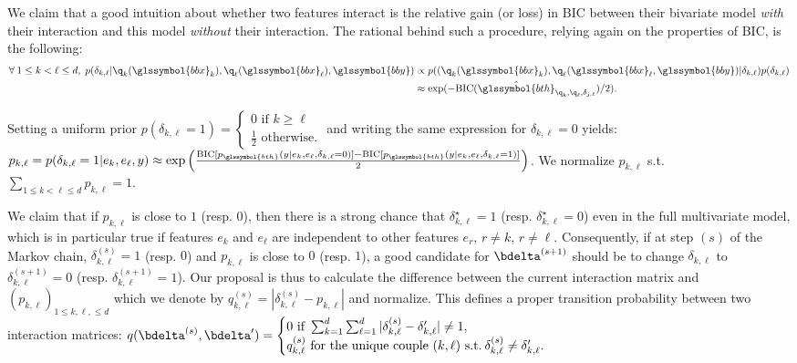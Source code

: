 We claim that a good intuition about whether two features interact is the relative gain (or loss) in BIC between their bivariate model \textit{with} their interaction and this model \textit{without} their interaction. The rational behind such a procedure, relying again on the properties of BIC, is the following: 
\begin{align*}
\forall \: 1 \leq k < \ell \leq d, \; p(\delta_{k,\ell} | \q_k(\glssymbol{bbx}_k), \q_\ell(\glssymbol{bbx}_\ell), \glssymbol{bby}) & \propto p((\q_k(\glssymbol{bbx}_k), \q_\ell(\glssymbol{bbx}_\ell, \glssymbol{bby}) | \delta_{k,\ell}) p(\delta_{k,\ell}) \\
& \approx \exp(-\text{BIC}(\hat{\glssymbol{bth}}_{\q_k,\q_\ell,\delta_{j,\ell}})/2).
\end{align*}

Setting a uniform prior $p(\delta_{k,\ell}=1) =\begin{cases} 0 \text{ if } k \geq \ell \\ \frac{1}{2} \text{ otherwise.} \end{cases}$ and writing the same expression for $\delta_{k,\ell} = 0$ yields: $p_{k,\ell} = p(\delta_{k,\ell}=1 | e_k, e_{\ell}, y) \approx \exp \left( \frac{\text{BIC}[p_{\glssymbol{bth}}(y | e_k, e_{\ell}, \delta_{k,\ell}=0)]-\text{BIC}[p_{\glssymbol{bth}}(y | e_k, e_{\ell}, \delta_{k,\ell}=1)]}{2} \right)$. We normalize $p_{k,\ell}$ s.t.\ $\sum_{1 \leq k < \ell \leq d} p_{k,\ell} = 1$.

We claim that if $p_{k,\ell}$ is close to $1$ (resp. $0$), then there is a strong chance that $\delta_{k,\ell}^\star = 1$ (resp. $\delta_{k,\ell}^\star = 0$) even in the full multivariate model, which is in particular true if features $e_k$ and $e_{\ell}$ are independent to other features $e_r$, $r \neq k$, $r \neq \ell$. Consequently, if at step $(s)$ of the Markov chain, $\delta_{k,\ell}^{(s)} = 1$ (resp. $0$) and $p_{k,\ell}$ is close to $0$ (resp. $1$), a good candidate for $\bdelta^{(s+1)}$ should be to change $\delta_{k,\ell}$ to $\delta_{k,\ell}^{(s+1)} = 0$ (resp. $\delta_{k,\ell}^{(s+1)} = 1$). Our proposal is thus to calculate the difference between the current interaction matrix and $(p_{k,\ell})_{1 \leq k,\ell, \leq d}$ which we denote by $q_{k,\ell}^{(s)} = |\delta_{k,\ell}^{(s)} - p_{k,\ell}|$ and normalize. This defines a proper transition probability between two interaction matrices: $q(\bdelta^{(s)},\bdelta') = \begin{cases} 0 \text{ if } \sum_{k=1}^d \sum_{\ell=1}^d |\delta^{(s)}_{k,\ell} - \delta_{k,\ell}'| \neq 1, \\ q_{k,\ell}^{(s)} \text{ for the unique couple } (k,\ell) \text{ s.t.} \: \delta^{(s)}_{k,\ell} \neq \delta_{k,\ell}'. \end{cases}$


